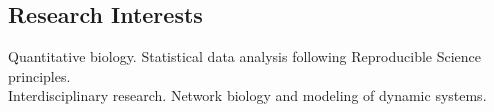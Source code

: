 \documentclass[margin,line]{res}
\begin{document}
\address{Calle Tambo Huascar 201, San Miguel, Lima-Peru}
\address{\textit{contact:} avallecam@gmail.com or (+51)950951722}

\begin{resume}

\vspace*{.15in}

\section{\sc Research Interests}%


Quantitative biology. Statistical data analysis following Reproducible Science principles.\\
Interdisciplinary research. Network biology and modeling of dynamic systems.\\%














\end{resume}
\end{document}
